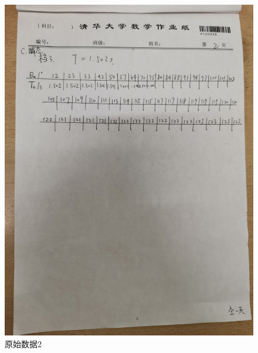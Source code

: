 \documentclass[a4paper,11pt]{article}
\begin{document}
        \begin{figure}[ht]
            \centering
            \includegraphics[scale=0.16]{原始数据2.jpg}
            \caption{原始数据2}
        \end{figure}
\end{document}

